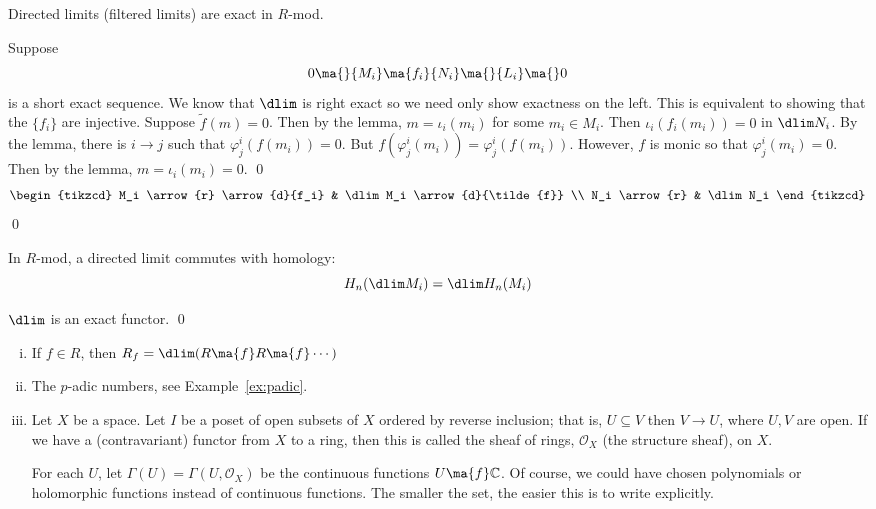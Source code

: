 \begin{thm}
Directed limits (filtered limits) are exact in $R$-mod. 
\end{thm}

\pf Suppose
	\[
	0 \ma{} \{M_i\} \ma{f_i} \{N_i\} \ma{} \{L_i\} \ma{} 0
	\]
is a short exact sequence. We know that $\dlim$ is right exact so we need only show exactness on the left. This is equivalent to showing that the $\{f_i\}$ are injective. Suppose $\tilde{f}(m)=0$. Then by the lemma, $m=\iota_i(m_i)$ for some $m_i \in M_i$. Then $\iota_i(f_i(m_i))=0$ in $\dlim N_i$. By the lemma, there is $i \to j$ such that $\varphi_j^i(f(m_i))=0$. But $f(\varphi_j^i(m_i))=\varphi_j^i(f(m_i))$. However, $f$ is monic so that $\varphi_j^i(m_i)=0$. Then by the lemma, $m=\iota_i(m_i)=0$. \qed \\
	\[
	\begin{tikzcd}
	M_i \arrow{r} \arrow{d}{f_i} & \dlim M_i \arrow{d}{\tilde{f}} \\
	N_i \arrow{r} & \dlim N_i
	\end{tikzcd}
	\] \qed \\


\begin{cor}
In $R$-mod, a directed limit commutes with homology:
	\[
	H_n(\dlim M_i) = \dlim H_n(M_i)
	\]
\end{cor}

\pf $\dlim$ is an exact functor. \qed \\


\begin{ex} \hfill
	\begin{enumerate}[(i)]
	\item If $f \in R$, then $R_f=\dlim(R \ma{f} R \ma{f} \cdots)$
	\item The $p$-adic numbers, see Example~\ref{ex:padic}. 
	\item Let $X$ be a space. Let $I$ be a poset of open subsets of $X$ ordered by reverse inclusion; that is, $U \subseteq V$ then $V \to U$, where $U,V$ are open. If we have a (contravariant) functor from $X$ to a ring, then this is called the sheaf of rings, $\mathcal{O}_X$ (the structure sheaf), on $X$. 
	
	For each $U$, let $\Gamma(U)=\Gamma(U,\mathcal{O}_X)$ be the continuous functions $U \ma{f} \mathbb{C}$. Of course, we could have chosen polynomials or holomorphic functions instead of continuous functions. The smaller the set, the easier this is to write explicitly. 
	\end{enumerate} \xqed
\end{ex}



